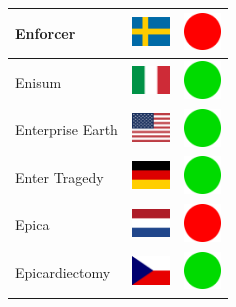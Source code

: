 \documentclass[12pt, a4paper, twoside]{report}
\begin{document}
\begin{center}
\begin{longtable}{|p{5cm}|p{2cm}|p{2cm}|}
Enforcer & \includegraphics[width=1cm]{4x3/se} & \includegraphics[width=1cm]{likes/n} \\ \hline
Enisum & \includegraphics[width=1cm]{4x3/it} & \includegraphics[width=1cm]{likes/y} \\ \hline
Enterprise Earth & \includegraphics[width=1cm]{4x3/us} & \includegraphics[width=1cm]{likes/y} \\ \hline
Enter Tragedy & \includegraphics[width=1cm]{4x3/de} & \includegraphics[width=1cm]{likes/y} \\ \hline
Epica & \includegraphics[width=1cm]{4x3/nl} & \includegraphics[width=1cm]{likes/n} \\ \hline
Epicardiectomy & \includegraphics[width=1cm]{4x3/cz} & \includegraphics[width=1cm]{likes/y} \\ \hline

\end{longtable}
\end{center}
\end{document}
